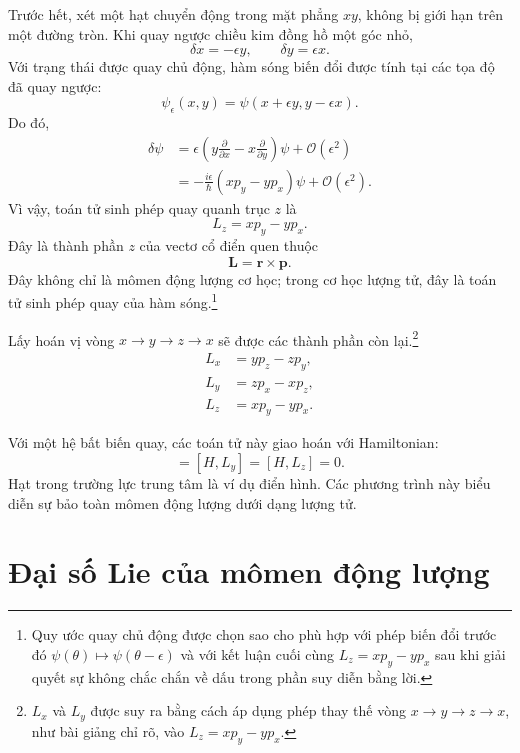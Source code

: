 Trước hết, xét một hạt chuyển động trong mặt phẳng \(xy\), không bị giới hạn trên một đường tròn. Khi quay ngược chiều kim đồng hồ một góc nhỏ,
\begin{equation}
\delta x=-\epsilon y,
\qquad
\delta y=\epsilon x.
\end{equation}
Với trạng thái được quay chủ động, hàm sóng biến đổi được tính tại các tọa độ đã quay ngược:
\begin{equation}
\psi_\epsilon(x,y)
=\psi(x+\epsilon y,y-\epsilon x).
\end{equation}
Do đó,
\begin{align}
\delta\psi
&=\epsilon\left(
y\frac{\partial}{\partial x}
-x\frac{\partial}{\partial y}
\right)\psi
+\mathcal O(\epsilon^2)\\
&=-\frac{i\epsilon}{\hbar}
\left(xp_y-yp_x\right)\psi
+\mathcal O(\epsilon^2).
\end{align}
Vì vậy, toán tử sinh phép quay quanh trục \(z\) là
\begin{equation}
L_z=xp_y-yp_x.
\end{equation}
Đây là thành phần \(z\) của vectơ cổ điển quen thuộc
\begin{equation}
\mathbf L=\mathbf r\times\mathbf p.
\end{equation}
Đây không chỉ là mômen động lượng cơ học; trong cơ học lượng tử, đây là toán tử sinh phép quay của hàm sóng.\footnote{Quy ước quay chủ động được chọn sao cho phù hợp với phép biến đổi trước đó \(\psi(\theta)\mapsto\psi(\theta-\epsilon)\) và với kết luận cuối cùng \(L_z=xp_y-yp_x\) sau khi giải quyết sự không chắc chắn về dấu trong phần suy diễn bằng lời.}

Lấy hoán vị vòng \(x\to y\to z\to x\) sẽ được các thành phần còn lại.\footnote{\(L_x\) và \(L_y\) được suy ra bằng cách áp dụng phép thay thế vòng \(x\to y\to z\to x\), như bài giảng chỉ rõ, vào \(L_z=xp_y-yp_x\).}
\begin{align}
L_x&=yp_z-zp_y,\\
L_y&=zp_x-xp_z,\\
L_z&=xp_y-yp_x.
\end{align}

Với một hệ bất biến quay, các toán tử này giao hoán với Hamiltonian:
\begin{equation}
[H,L_x]=[H,L_y]=[H,L_z]=0.
\end{equation}
Hạt trong trường lực trung tâm là ví dụ điển hình. Các phương trình này biểu diễn sự bảo toàn mômen động lượng dưới dạng lượng tử.

\section{Đại số Lie của mômen động lượng}

